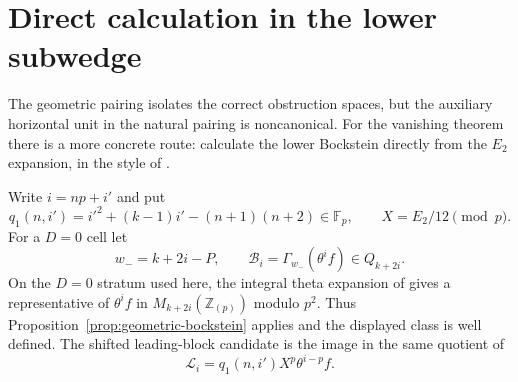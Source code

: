 \section{Direct calculation in the lower subwedge}

The geometric pairing isolates the correct obstruction spaces, but the
auxiliary horizontal unit in the natural pairing is noncanonical.  For the
vanishing theorem there is a more concrete route: calculate the lower
Bockstein directly from the $E_2$ expansion, in the style of
\cite{ARR2026}.

Write $i=np+i'$ and put
\[
 q_1(n,i')=i'^2+(k-1)i'-(n+1)(n+2)\in\mathbb F_p,
 \qquad X=E_2/12\pmod p.
\]
For a $D=0$ cell let
\[
 w_-=k+2i-P,
 \qquad
 \mathcal B_i=\Gamma_{w_-}(\theta^if)\in Q_{k+2i}.
\]
On the $D=0$ stratum used here, the integral theta expansion of
\cite{ARR2026,ChenKiming2016} gives a representative of $\theta^if$ in
$M_{k+2i}(\mathbb Z_{(p)})$ modulo $p^2$.  Thus
Proposition~\ref{prop:geometric-bockstein} applies and the displayed class
is well defined.
The shifted leading-block candidate is the image in the same quotient of
\begin{equation}\label{eq:shifted-leading-block}
 \mathcal L_i=q_1(n,i')X^p\theta^{i-p}f.
\end{equation}

